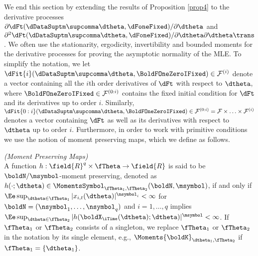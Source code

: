 We end this section by extending the results of Proposition \ref{prop4} to the derivative processes 
$\partial\dFt(\dDataSuptm\supcomma\dtheta,\dFoneFixed)/\partial\dtheta$
and
$\partial^2\dFt(\dDataSuptm\supcomma\dtheta,\dFoneFixed)/\partial\dtheta\partial\dtheta\trans$. We often use the stationarity, ergodicity, invertibility and bounded moments for the derivative processes for proving the asymptotic normality of the MLE. 
To simplify the notation, we let $\dFit{i}(\dDataSuptm\supcomma\dtheta,\BoldFOneZeroIFixed) \in \mathcal{F}^{(i)}$ denote a vector containing all the $i$th order derivatives of $\dFt$ with respect to $\dtheta$, where $\BoldFOneZeroIFixed \in \mathcal{F}^{(0:i)}$ contains the fixed initial condition for $\dFt$ and its derivatives up to order $i$.
Similarly, $\dFit{0:i}(\dDataSuptm\supcomma\dtheta,\BoldFOneZeroIFixed) \in \mathcal{F}^{(0:i)} = \mathcal{F} \times \ldots \times \mathcal{F}^{(i)}$ denotes a vector containing $\dFt$ as well as its derivatives with respect to $\dtheta$ up to order $i$.
Furthermore, in order to work with primitive conditions we use the notion of moment preserving maps, which we define as follows.


\begin{defn}    \label{def1} 
    \emph{(Moment Preserving Maps)}\\
A function 
$h: \field{R}^{q} \times \fTheta \to \field{R}$  
is said to be $\boldN/\msymbol$-moment preserving, denoted as
$h(\cdot;\dtheta) \in \MomentsSymbol_{\fTheta_1,\fTheta_2} (\boldN,\msymbol)$, 
if and only if 
$\Ee \sup_{\dtheta \in \fTheta_1} |x_{i,t}(\dtheta)|^{\nsymbol_{i}}<\infty$
for
$\boldN = (\nsymbol_{1},\ldots,\nsymbol_{q})$
and
$i=1,\ldots,q$ implies 
$\Ee \sup_{\dtheta \in \fTheta_2} |h(\boldX_{\iTime}(\dtheta);\dtheta)|^{\msymbol}<\infty$.
If $\fTheta_1$ or $\fTheta_2$ consists of a singleton, we replace $\fTheta_1$ or $\fTheta_2$ in the notation by its single element, e.g., 
$\Moments{\boldK}_{\dtheta_1,\fTheta_2}$ 
if $\fTheta_1 = \{\dtheta_1\}$.
\end{defn}


